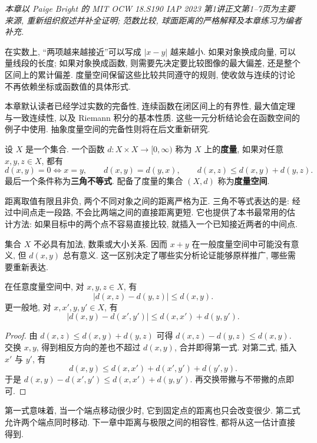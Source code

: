 \label{ch:metric}
\emph{本章以 Paige Bright 的 MIT OCW 18.S190 IAP 2023 第1讲正文第1--7页为主要来源, 重新组织叙述并补全证明; 范数比较, 球面距离的严格解释及本章练习为编者补充.}

在实数上, ``两项越来越接近''可以写成 $|x-y|$ 越来越小. 如果对象换成向量, 可以量线段的长度; 如果对象换成函数, 则需要先决定要比较图像的最大偏差, 还是整个区间上的累计偏差. 度量空间保留这些比较共同遵守的规则, 使收敛与连续的讨论不再依赖坐标或函数值的具体形式.

本章默认读者已经学过实数的完备性, 连续函数在闭区间上的有界性, 最大值定理与一致连续性, 以及 Riemann 积分的基本性质. 这些一元分析结论会在函数空间的例子中使用. 抽象度量空间的完备性则将在后文重新研究.

\label{ch:metric:axioms}
\begin{definition}[度量空间]
设 $X$ 是一个集合. 一个函数 $d:X\times X\to[0,\infty)$ 称为 $X$ 上的\textbf{度量}, 如果对任意 $x,y,z\in X$, 都有
\[
 d(x,y)=0\Longleftrightarrow x=y,\qquad
 d(x,y)=d(y,x),\qquad
 d(x,z)\le d(x,y)+d(y,z).
\]
最后一个条件称为\textbf{三角不等式}. 配备了度量的集合 $(X,d)$ 称为\textbf{度量空间}.
\end{definition}
距离取值有限且非负, 两个不同对象之间的距离严格为正. 三角不等式表达的是: 经过中间点走一段路, 不会比两端之间的直接距离更短. 它也提供了本书最常用的估计方法: 如果目标中的两个点不容易直接比较, 就插入一个已知接近两者的中间点.

集合 $X$ 不必具有加法, 数乘或大小关系. 因而 $x+y$ 在一般度量空间中可能没有意义, 但 $d(x,y)$ 总有意义. 这一区别决定了哪些实分析论证能够原样推广, 哪些需要重新表达.

\begin{lemma}[反三角不等式]\label{ch:metric:reverse}
在任意度量空间中, 对 $x,y,z\in X$, 有
\[
 |d(x,z)-d(y,z)|\le d(x,y).
\]
更一般地, 对 $x,x',y,y'\in X$, 有
\[
 |d(x,y)-d(x',y')|\le d(x,x')+d(y,y').
\]
\end{lemma}
\begin{proof}
由 $d(x,z)\le d(x,y)+d(y,z)$ 可得 $d(x,z)-d(y,z)\le d(x,y)$. 交换 $x,y$, 得到相反方向的差也不超过 $d(x,y)$, 合并即得第一式. 对第二式, 插入 $x'$ 与 $y'$, 有
\[
 d(x,y)\le d(x,x')+d(x',y')+d(y',y).
\]
于是 $d(x,y)-d(x',y')\le d(x,x')+d(y,y')$. 再交换带撇与不带撇的点即可.
\end{proof}
第一式意味着, 当一个端点移动很少时, 它到固定点的距离也只会改变很少. 第二式允许两个端点同时移动. 下一章中距离与极限之间的相容性, 都将从这一估计直接得到.

